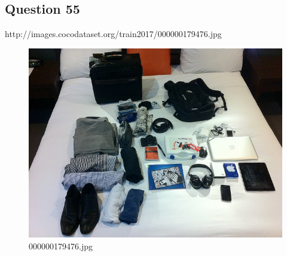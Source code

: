 \subsection*{Question 55}
http://images.cocodataset.org/train2017/000000179476.jpg
\begin{figure}[h]
    \centering
    \includegraphics[width=0.8\linewidth]{../image set/hard/000000179476.jpg}
    \caption{000000179476.jpg}
\end{figure} 
